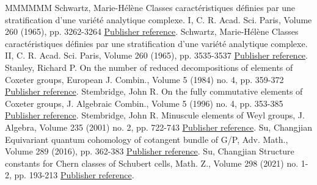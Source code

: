 \documentclass[11pt]{article}
\theoremstyle{definition}
\numberwithin{equation}{section}
\begin{document}
\begin{thebibliography}{MMMMMM}
 Schwartz, Marie-Hélène Classes caractéristiques définies par une stratification d’une variété analytique complexe. I, C. R. Acad. Sci. Paris, Volume 260 (1965), pp. 3262-3264 \href{https://alco.centre-mersenne.org/articles/10.5802/alco.428/#schwartz:1}{Publisher reference}.
 Schwartz, Marie-Hélène Classes caractéristiques définies par une stratification d’une variété analytique complexe. II, C. R. Acad. Sci. Paris, Volume 260 (1965), pp. 3535-3537 \href{https://alco.centre-mersenne.org/articles/10.5802/alco.428/#schwartz:2}{Publisher reference}.
 Stanley, Richard P. On the number of reduced decompositions of elements of Coxeter groups, European J. Combin., Volume 5 (1984) no. 4, pp. 359-372 \href{https://alco.centre-mersenne.org/articles/10.5802/alco.428/#stanley:reduced}{Publisher reference}.
 Stembridge, John R. On the fully commutative elements of Coxeter groups, J. Algebraic Combin., Volume 5 (1996) no. 4, pp. 353-385 \href{https://alco.centre-mersenne.org/articles/10.5802/alco.428/#stembridge:fullycomm}{Publisher reference}.
 Stembridge, John R. Minuscule elements of Weyl groups, J. Algebra, Volume 235 (2001) no. 2, pp. 722-743 \href{https://alco.centre-mersenne.org/articles/10.5802/alco.428/#stembridge2001minuscule}{Publisher reference}.
 Su, Changjian Equivariant quantum cohomology of cotangent bundle of G/P, Adv. Math., Volume 289 (2016), pp. 362-383 \href{https://alco.centre-mersenne.org/articles/10.5802/alco.428/#su:quantum}{Publisher reference}.
 Su, Changjian Structure constants for Chern classes of Schubert cells, Math. Z., Volume 298 (2021) no. 1-2, pp. 193-213 \href{https://alco.centre-mersenne.org/articles/10.5802/alco.428/#su:structure}{Publisher reference}.
\end{thebibliography}
\end{document}
